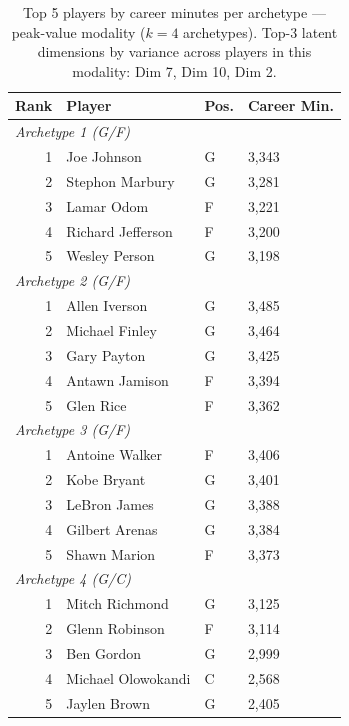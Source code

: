 \begin{table}[htbp]
  \centering\small
  \begin{tabular}{rlll}
    \toprule
    Rank & Player & Pos. & Career Min. \\
    \midrule
    \multicolumn{4}{l}{\textit{Archetype 1 (G/F)}} \\
    \midrule
    1 & Joe Johnson & G & 3,343 \\
    2 & Stephon Marbury & G & 3,281 \\
    3 & Lamar Odom & F & 3,221 \\
    4 & Richard Jefferson & F & 3,200 \\
    5 & Wesley Person & G & 3,198 \\
    \midrule[0.4pt]
    \multicolumn{4}{l}{\textit{Archetype 2 (G/F)}} \\
    \midrule
    1 & Allen Iverson & G & 3,485 \\
    2 & Michael Finley & G & 3,464 \\
    3 & Gary Payton & G & 3,425 \\
    4 & Antawn Jamison & F & 3,394 \\
    5 & Glen Rice & F & 3,362 \\
    \midrule[0.4pt]
    \multicolumn{4}{l}{\textit{Archetype 3 (G/F)}} \\
    \midrule
    1 & Antoine Walker & F & 3,406 \\
    2 & Kobe Bryant & G & 3,401 \\
    3 & LeBron James & G & 3,388 \\
    4 & Gilbert Arenas & G & 3,384 \\
    5 & Shawn Marion & F & 3,373 \\
    \midrule[0.4pt]
    \multicolumn{4}{l}{\textit{Archetype 4 (G/C)}} \\
    \midrule
    1 & Mitch Richmond & G & 3,125 \\
    2 & Glenn Robinson & F & 3,114 \\
    3 & Ben Gordon & G & 2,999 \\
    4 & Michael Olowokandi & C & 2,568 \\
    5 & Jaylen Brown & G & 2,405 \\
    \bottomrule
  \end{tabular}
  \caption{Top 5 players by career minutes per archetype --- peak-value modality ($k=4$ archetypes). Top-3 latent dimensions by variance across players in this modality: Dim 7, Dim 10, Dim 2.}
  \label{tab:arch_reps_peak_value}
\end{table}

